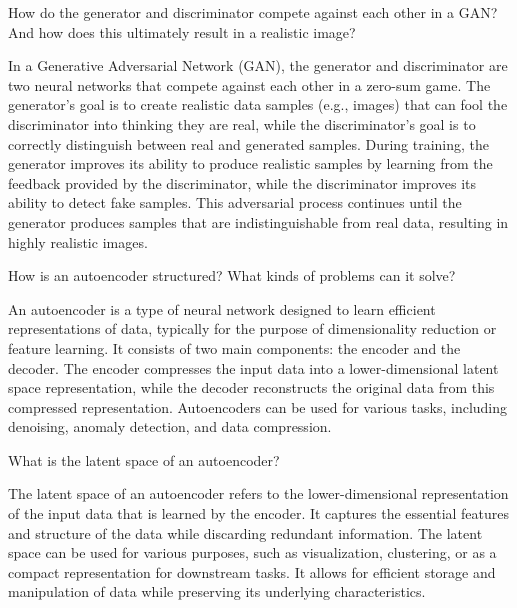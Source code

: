 \begin{ejercicio}[GAN]
    How do the generator and discriminator compete against each other in a GAN? And how does this ultimately result in a realistic image?

    In a Generative Adversarial Network (GAN), the generator and discriminator are two neural networks that compete against each other in a zero-sum game. The generator's goal is to create realistic data samples (e.g., images) that can fool the discriminator into thinking they are real, while the discriminator's goal is to correctly distinguish between real and generated samples. During training, the generator improves its ability to produce realistic samples by learning from the feedback provided by the discriminator, while the discriminator improves its ability to detect fake samples. This adversarial process continues until the generator produces samples that are indistinguishable from real data, resulting in highly realistic images.
\end{ejercicio}

\begin{ejercicio}[Autoencoder]
    How is an autoencoder structured? What kinds of problems can it solve?

    An autoencoder is a type of neural network designed to learn efficient representations of data, typically for the purpose of dimensionality reduction or feature learning. It consists of two main components: the encoder and the decoder. The encoder compresses the input data into a lower-dimensional latent space representation, while the decoder reconstructs the original data from this compressed representation. Autoencoders can be used for various tasks, including denoising, anomaly detection, and data compression.
\end{ejercicio}

\begin{ejercicio}
    What is the latent space of an autoencoder?

    The latent space of an autoencoder refers to the lower-dimensional representation of the input data that is learned by the encoder. It captures the essential features and structure of the data while discarding redundant information. The latent space can be used for various purposes, such as visualization, clustering, or as a compact representation for downstream tasks. It allows for efficient storage and manipulation of data while preserving its underlying characteristics.
\end{ejercicio}